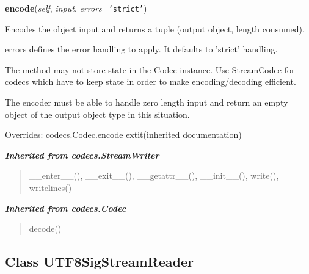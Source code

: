 \hspace{.8\funcindent}\begin{boxedminipage}{\funcwidth}

    \raggedright \textbf{encode}(\textit{self}, \textit{input}, \textit{errors}={\tt 'strict'})

\setlength{\parskip}{2ex}
    Encodes the object input and returns a tuple (output object, length 
    consumed).

    errors defines the error handling to apply. It defaults to 'strict' 
    handling.

    The method may not store state in the Codec instance. Use StreamCodec 
    for codecs which have to keep state in order to make encoding/decoding 
    efficient.

    The encoder must be able to handle zero length input and return an 
    empty object of the output object type in this situation.

\setlength{\parskip}{1ex}
      Overrides: codecs.Codec.encode 	extit{(inherited documentation)}

    \end{boxedminipage}


\large{\textbf{\textit{Inherited from codecs.StreamWriter}}}

\begin{quote}
\_\_enter\_\_(), \_\_exit\_\_(), \_\_getattr\_\_(), \_\_init\_\_(), write(), writelines()
\end{quote}

\large{\textbf{\textit{Inherited from codecs.Codec}}}

\begin{quote}
decode()
\end{quote}


\subsection{Class UTF8SigStreamReader}


